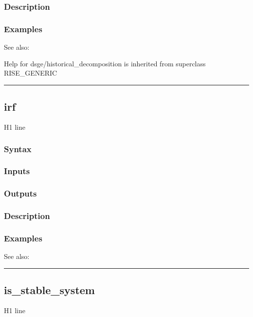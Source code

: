 \documentclass[letterpaper,10pt,english]{sphinxmanual}
\begin{document}
\subsubsection{Description}
\label{classes/models/@dsge/dsge:id60}

\subsubsection{Examples}
\label{classes/models/@dsge/dsge:id61}
See also:

Help for dsge/historical\_decomposition is inherited from superclass RISE\_GENERIC


\bigskip\hrule{}\bigskip



\subsection{irf}
\label{classes/models/@dsge/dsge:irf}\label{classes/models/@dsge/dsge:id62}
H1 line


\subsubsection{Syntax}
\label{classes/models/@dsge/dsge:id63}

\subsubsection{Inputs}
\label{classes/models/@dsge/dsge:id64}

\subsubsection{Outputs}
\label{classes/models/@dsge/dsge:id65}

\subsubsection{Description}
\label{classes/models/@dsge/dsge:id66}

\subsubsection{Examples}
\label{classes/models/@dsge/dsge:id67}
See also:


\bigskip\hrule{}\bigskip



\subsection{is\_stable\_system}
\label{classes/models/@dsge/dsge:is-stable-system}\label{classes/models/@dsge/dsge:id68}
H1 line
\end{document}
